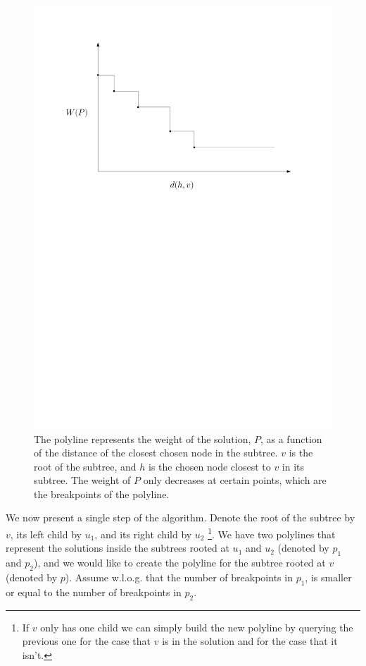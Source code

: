\documentclass[11pt,a4paper]{article}
\theoremstyle{definition}
\theoremstyle{remark}
\begin{document}
\begin{figure}[h]
\begin{center}
\includegraphics[scale=0.35]{polyline}
\end{center}
\caption{The polyline represents the weight of the solution, $P$, as a function of the distance of the closest chosen node in the subtree. $v$ is the root of the subtree, and $h$ is the chosen node closest to $v$ in its subtree. The weight of $P$ only decreases at certain points, which are the breakpoints of the polyline.
\label{figure of a polyline}}
\end{figure}

We now present a single step of the algorithm. Denote the root of the subtree by $v$, its left child by $u_1$, and its right child by $u_2$ \footnote{If $v$ only has one child we can simply build the new polyline by querying the previous one for the case that $v$ is in the solution and for the case that it isn't.}. We have two polylines that represent the solutions inside the subtrees rooted at $u_1$ and $u_2$ (denoted by $p_1$ and $p_2$), and we would like to create the polyline for the subtree rooted at $v$ (denoted by $p$).
Assume w.l.o.g. that the number of breakpoints in $p_1$, is smaller or equal to the number of breakpoints in $p_2$.
\end{document}
